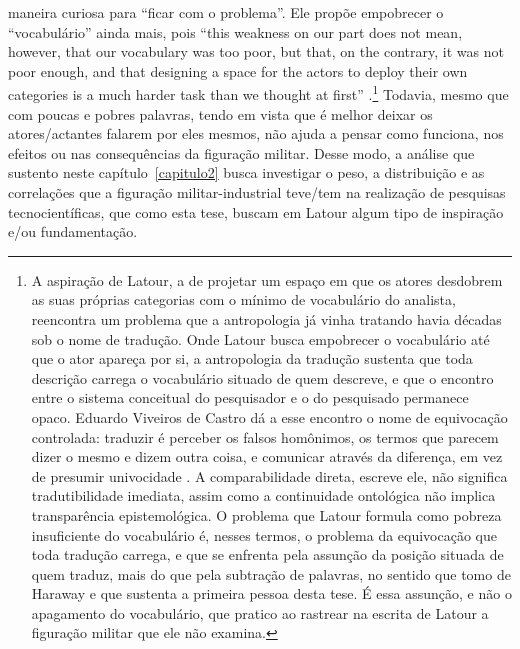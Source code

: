 maneira curiosa para \enquote{ficar com o problema}. Ele propõe empobrecer o \enquote{vocabulário} ainda mais, pois \enquote{this weakness on our part does not mean, however, that our vocabulary was too poor, but that, on the contrary, it was not poor enough, and that designing a space for the actors to deploy their own categories is a much harder task than we thought at first} \parencite[p.~20]{Latour1999RecallingANT}.\footnote{A aspiração de Latour, a de projetar um espaço em que os atores desdobrem as suas próprias categorias com o mínimo de vocabulário do analista, reencontra um problema que a antropologia já vinha tratando havia décadas sob o nome de tradução. Onde Latour busca empobrecer o vocabulário até que o ator apareça por si, a antropologia da tradução sustenta que toda descrição carrega o vocabulário situado de quem descreve, e que o encontro entre o sistema conceitual do pesquisador e o do pesquisado permanece opaco. Eduardo Viveiros de Castro dá a esse encontro o nome de equivocação controlada: traduzir é perceber os falsos homônimos, os termos que parecem dizer o mesmo e dizem outra coisa, e comunicar através da diferença, em vez de presumir univocidade \parencite{ViveirosdeCastro2018Equivocacao}. A comparabilidade direta, escreve ele, não significa tradutibilidade imediata, assim como a continuidade ontológica não implica transparência epistemológica. O problema que Latour formula como pobreza insuficiente do vocabulário é, nesses termos, o problema da equivocação que toda tradução carrega, e que se enfrenta pela assunção da posição situada de quem traduz, mais do que pela subtração de palavras, no sentido que tomo de Haraway e que sustenta a primeira pessoa desta tese. É essa assunção, e não o apagamento do vocabulário, que pratico ao rastrear na escrita de Latour a figuração militar que ele não examina.} Todavia, mesmo que com poucas e pobres palavras, tendo em vista que é melhor deixar os atores/actantes falarem por eles mesmos, não ajuda a pensar como funciona, nos efeitos ou nas consequências da figuração militar. Desse modo, a análise que sustento neste capítulo~\ref{capitulo2} busca investigar o peso, a distribuição e as correlações que a figuração militar-industrial teve/tem na realização de pesquisas tecnocientíficas, que como esta tese, buscam em Latour algum tipo de inspiração e/ou fundamentação.
 
